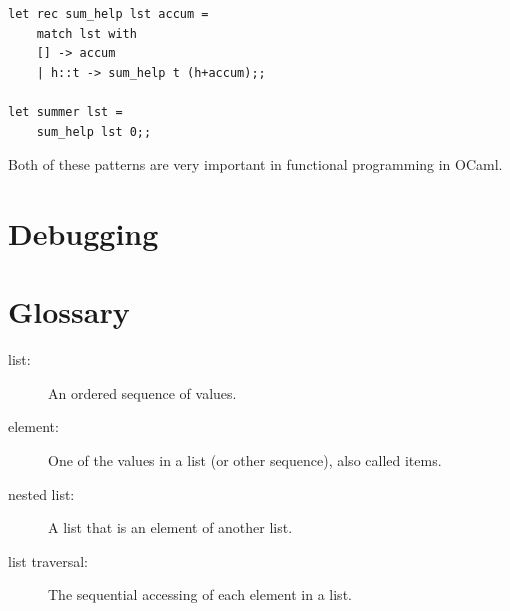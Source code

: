 \documentclass[10pt]{book}
\begin{document}
{\beforeverb
\begin{verbatim}
let rec sum_help lst accum = 
	match lst with
	[] -> accum
	| h::t -> sum_help t (h+accum);;

let summer lst = 
	sum_help lst 0;;
\end{verbatim}
\afterverb

Both of these patterns are very important in functional 
programming in OCaml.

\section{Debugging}

% 
% 
% 
% 


\section{Glossary}

\begin{description}

\item[list:] An ordered sequence of values.

\item[element:] One of the values in a list (or other sequence),
also called items.

% 
\item[nested list:] A list that is an element of another list.

\item[list traversal:] The sequential accessing of each element in a list.

% 
% 
% 


\end{description}}
\end{document}
